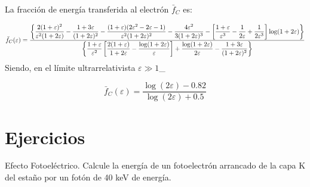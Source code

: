 La fracción de energía transferida al electrón $\bar{f}_C$ es: 

\begin{equation} \scriptsize
\bar{f}_C(\varepsilon) =
\frac{
\left\{
\dfrac{2(1+\varepsilon)^2}{\varepsilon^2(1+2\varepsilon)}
- \dfrac{1+3\varepsilon}{(1+2\varepsilon)^2}
- \dfrac{(1+\varepsilon)(2\varepsilon^2 - 2\varepsilon - 1)}{\varepsilon^2(1+2\varepsilon)^2}
- \dfrac{4\varepsilon^2}{3(1+2\varepsilon)^3}
- \left[\dfrac{1+\varepsilon}{\varepsilon^3} - \dfrac{1}{2\varepsilon} + \dfrac{1}{2\varepsilon^3}\right] \log(1+2\varepsilon)
\right\}
}{
\left\{
\dfrac{1+\varepsilon}{\varepsilon^2} \left[\dfrac{2(1+\varepsilon)}{1+2\varepsilon} - \dfrac{\log(1+2\varepsilon)}{\varepsilon}\right]
+ \dfrac{\log(1+2\varepsilon)}{2\varepsilon}
- \dfrac{1+3\varepsilon}{(1+2\varepsilon)^2}
\right\}
}
\end{equation}
Siendo, en el límite ultrarrelativista $\varepsilon\gg 1$_


\begin{equation} 
\bar{f}_C(\varepsilon) = \frac{\log (2\varepsilon)-0.82}{\log(2\varepsilon)+0.5}
\end{equation}



\section*{Ejercicios}


\begin{Ejercicio}{Efecto Fotoeléctrico.}
    Calcule la energía de un fotoelectrón arrancado de la capa K del estaño por un fotón de 40 keV de energía.
\end{Ejercicio}

